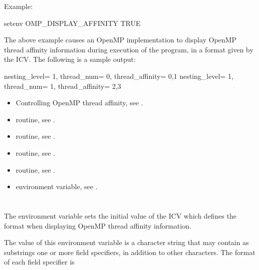 Example:
\begin{ompEnv}
setenv OMP_DISPLAY_AFFINITY TRUE
\end{ompEnv}

The above example causes an OpenMP implementation to display OpenMP thread affinity information during execution of
the program, in a format given by the  ICV.  The following is a sample output:
\begin{ompSyntax}
nesting_level=   1,   thread_num=   0,   thread_affinity=    0,1
nesting_level=   1,   thread_num=   1,   thread_affinity=    2,3
\end{ompSyntax}

\crossreferences
\begin{itemize}

\item Controlling OpenMP thread affinity, see
.
\item {} routine, see .
\item {} routine, see .
\item {} routine, see .
\item {} routine, see .
\item {} environment variable, see
.
\end{itemize}


\section{}
\label{sec:OMP_AFFINITY_FORMAT}

The  environment variable sets the initial value of the
 ICV which defines the format when displaying OpenMP
thread affinity information.


The value of this environment variable is a character string that may contain as
substrings one or more field specifiers, in addition to other characters.
The format of each field specifier is

